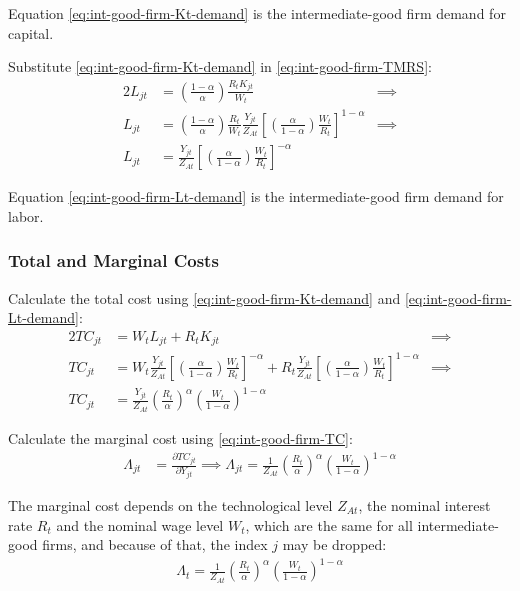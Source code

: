 \documentclass[
	12pt, 
	]{article}
\numberwithin{equation}{section}
\theoremstyle{definition}
\theoremstyle{plain}
\theoremstyle{plain}
\theoremstyle{plain}
\begin{document}
Equation \ref{eq:int-good-firm-Kt-demand} is the intermediate-good firm demand for capital. 

Substitute \ref{eq:int-good-firm-Kt-demand} in \ref{eq:int-good-firm-TMRS}:
\begin{alignat}{2}
	L_{jt} & = \left( \frac{1-\alpha}{\alpha} \right) \frac{R_t K_{jt}}{W_t} &\implies \nonumber \\
	L_{jt} & = \left( \frac{1-\alpha}{\alpha} \right) \frac{R_t}{W_t} \frac{Y_{jt}}{Z_{At}} \left[ \left( \frac{\alpha}{1-\alpha} \right) \frac{W_t}{R_t}\right]^{1-\alpha} &\implies \nonumber \\
	L_{jt} & = \frac{Y_{jt}}{Z_{At}} \left[ \left( \frac{\alpha}{1-\alpha} \right) \frac{W_t}{R_t}\right]^{-\alpha} \label{eq:int-good-firm-Lt-demand}
\end{alignat}

Equation \ref{eq:int-good-firm-Lt-demand} is the intermediate-good firm demand for labor.

\subsubsection*{Total and Marginal Costs}

Calculate the total cost using \ref{eq:int-good-firm-Kt-demand} and \ref{eq:int-good-firm-Lt-demand}:
\begin{alignat}{2}
	TC_{jt} & = W_t L_{jt} + R_t K_{jt} &\implies \nonumber \\
	TC_{jt} & = W_t \frac{Y_{jt}}{Z_{At}} \left[ \left( \frac{\alpha}{1-\alpha} \right) \frac{W_t}{R_t} \right]^{-\alpha} + R_t \frac{Y_{jt}}{Z_{At}} \left[ \left( \frac{\alpha}{1-\alpha} \right) \frac{W_t}{R_t} \right]^{1-\alpha} &\implies \nonumber \\
	TC_{jt} & = \frac{Y_{jt}}{Z_{At}} \left( \frac{R_t}{\alpha} \right)^{\alpha} \left( \frac{W_t}{1-\alpha} \right)^{1-\alpha} \label{eq:int-good-firm-TC}
\end{alignat}


Calculate the marginal cost using \ref{eq:int-good-firm-TC}: 
\begin{align}
\label{eq:int-good-firm-MC}
	\Lambda_{jt} & = \frac{\partial TC_{jt}}{\partial Y_{jt}}
\implies 
	\Lambda_{jt} = \frac{1}{Z_{At}} \left( \frac{R_t}{\alpha} \right)^{\alpha} \left( \frac{W_t}{1-\alpha} \right)^{1-\alpha}
\end{align}

The marginal cost depends on the technological level $Z_{At}$, the nominal interest rate $R_t$ and the nominal wage level $W_t$, which are the same for all intermediate-good firms, and because of that, the index $j$ may be dropped:
\begin{align}
	\label{eq:int-good-firm-MC-2}
	\Lambda_t = \frac{1}{Z_{At}} \left( \frac{R_t}{\alpha} \right)^{\alpha} \left( \frac{W_t}{1-\alpha} \right)^{1-\alpha}
\end{align}
\end{document}
